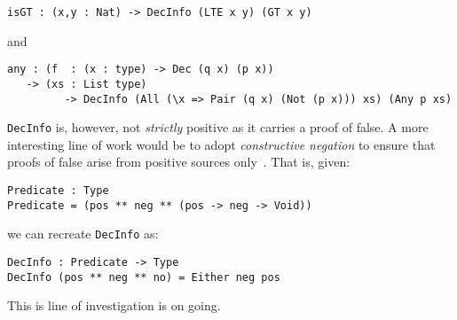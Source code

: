 \begin{verbatim}
isGT : (x,y : Nat) -> DecInfo (LTE x y) (GT x y)
\end{verbatim}

\noindent
and

\begin{verbatim}
any : (f  : (x : type) -> Dec (q x) (p x))
   -> (xs : List type)
         -> DecInfo (All (\x => Pair (q x) (Not (p x))) xs) (Any p xs)
\end{verbatim}

\texttt{DecInfo} is, however, not \emph{strictly} positive as it carries a proof of false.
A more interesting line of work would be to adopt \emph{constructive negation} to ensure that proofs of false arise from positive sources only~\cite{msfp/Atkey22}.
That is, given:

\begin{verbatim}
Predicate : Type
Predicate = (pos ** neg ** (pos -> neg -> Void))
\end{verbatim}

we can recreate \texttt{DecInfo} as:

\begin{verbatim}
DecInfo : Predicate -> Type
DecInfo (pos ** neg ** no) = Either neg pos
\end{verbatim}

This is line of investigation is on going.
